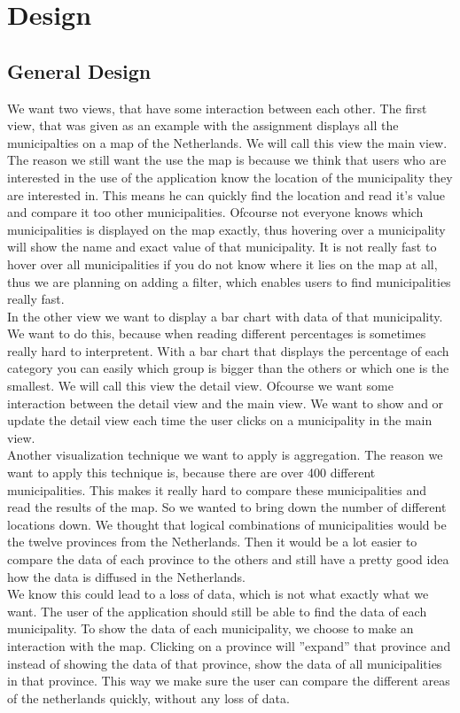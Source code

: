 \section{Design}\label{sec:des}
\subsection{General Design}
We want two views, that have some interaction between each other. The first view, that was given as an example with the assignment displays all the municipalties on a map of the Netherlands. We will call this view the main view. The reason we still want the use the map is because we think that users who are interested in the use of the application know the location of the municipality they are interested in. This means he can quickly find the location and read it's value and compare it too other municipalities. Ofcourse not everyone knows which municipalities is displayed on the map exactly, thus hovering over a municipality will show the name and exact value of that municipality. It is not really fast to hover over all municipalities if you do not know where it lies on the map at all, thus we are planning on adding a filter, which enables users to find municipalities really fast. \\
In the other view we want to display a bar chart with data of that municipality.  We want to do this, because when reading different percentages is sometimes really hard to interpretent. With a bar chart that displays the percentage of each category you can easily which group is bigger than the others or which one is the smallest. We will call this view the detail view. Ofcourse we want some interaction between the detail view and the main view. We want to show and or update the detail view each time the user clicks on a municipality in the main view. \\
Another visualization technique we want to apply is aggregation. The reason we want to apply this technique is, because there are over 400 different municipalities. This makes it really hard to compare these municipalities and read the results of the map. So we wanted to bring down the number of different locations down. We thought that logical combinations of municipalities would be the twelve provinces from the Netherlands. Then it would be a lot easier to compare the data of each province to the others and still have a pretty good idea how the data is diffused in the Netherlands. \\
We know this could lead to a loss of data, which is not what exactly what we want. The user of the application should still be able to find the data of each municipality. To show the data of each municipality, we choose to make an interaction with the map. Clicking on a province will ''expand'' that province and instead of showing the data of that province, show the data of all municipalities in that province. This way we make sure the user can compare the different areas of the netherlands quickly, without any loss of data. \\
